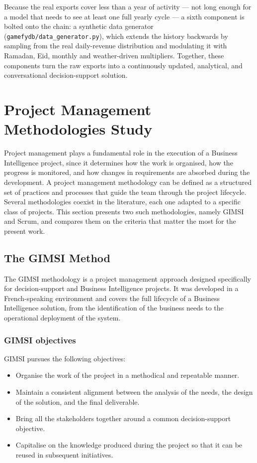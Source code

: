 \documentclass[12pt, a4paper]{report}
\begin{document}
Because the real exports cover less than a year of activity ---
not long enough for a model that needs to see at least one full
yearly cycle --- a sixth component is bolted onto the chain: a
synthetic data generator (\texttt{gamefydb/data\_generator.py}),
which extends the history backwards by sampling from the real
daily-revenue distribution and modulating it with Ramadan, Eid,
monthly and weather-driven multipliers. Together, these
components turn the raw exports into a continuously updated, analytical, and
conversational decision-support solution.

\section{Project Management Methodologies Study}

Project management plays a fundamental role in the execution of a Business
Intelligence project, since it determines how the work is organised, how the
progress is monitored, and how changes in requirements are absorbed during
the development. A project management methodology can be defined as a
structured set of practices and processes that guide the team through the
project lifecycle. Several methodologies coexist in the literature, each one
adapted to a specific class of projects. This section presents two such
methodologies, namely GIMSI and Scrum, and compares them on the criteria
that matter the most for the present work.

\subsection{The GIMSI Method}

The GIMSI methodology is a project management approach designed specifically
for decision-support and Business Intelligence projects. It was developed in
a French-speaking environment and covers the full lifecycle of a Business
Intelligence solution, from the identification of the business needs to the
operational deployment of the system.

\subsubsection{GIMSI objectives}

GIMSI pursues the following objectives:

\begin{itemize}[noitemsep]
  \item Organise the work of the project in a methodical and repeatable
        manner.
  \item Maintain a consistent alignment between the analysis of the needs,
        the design of the solution, and the final deliverable.
  \item Bring all the stakeholders together around a common decision-support
        objective.
  \item Capitalise on the knowledge produced during the project so that it
        can be reused in subsequent initiatives.
\end{itemize}
\end{document}

